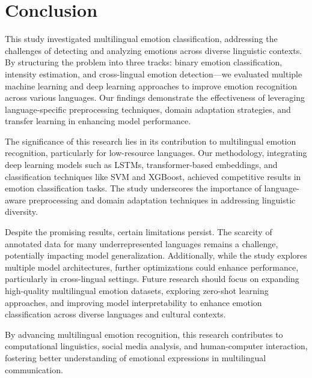\section{Conclusion}
This study investigated multilingual emotion classification, addressing the challenges of detecting and analyzing emotions across diverse linguistic contexts. By structuring the problem into three tracks: binary emotion classification, intensity estimation, and cross-lingual emotion detection—we evaluated multiple machine learning and deep learning approaches to improve emotion recognition across various languages. Our findings demonstrate the effectiveness of leveraging language-specific preprocessing techniques, domain adaptation strategies, and transfer learning in enhancing model performance.

The significance of this research lies in its contribution to multilingual emotion recognition, particularly for low-resource languages. Our methodology, integrating deep learning models such as LSTMs, transformer-based embeddings, and classification techniques like SVM and XGBoost, achieved competitive results in emotion classification tasks. The study underscores the importance of language-aware preprocessing and domain adaptation techniques in addressing linguistic diversity.

Despite the promising results, certain limitations persist. The scarcity of annotated data for many underrepresented languages remains a challenge, potentially impacting model generalization. Additionally, while the study explores multiple model architectures, further optimizations could enhance performance, particularly in cross-lingual settings. Future research should focus on expanding high-quality multilingual emotion datasets, exploring zero-shot learning approaches, and improving model interpretability to enhance emotion classification across diverse languages and cultural contexts.

By advancing multilingual emotion recognition, this research contributes to computational linguistics, social media analysis, and human-computer interaction, fostering better understanding of emotional expressions in multilingual communication.

